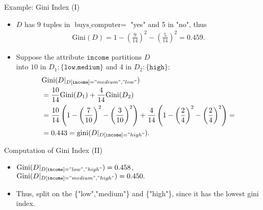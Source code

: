\begin{frame}{Example: Gini Index (I)}
	\begin{itemize}
		\item $D$ has $9$ tuples in $\text{buys\_computer} =$ "yes" and 5 in "no", thus
		      \begin{align*}
			      \text{Gini}(D) = 1 - \left( \frac{9}{14} \right)^2 - \left( \frac{5}{14} \right)^2 = 0.459.
		      \end{align*}
		\item Suppose the attribute $\texttt{income}$ partitions $D$ \\ into $10$ in
		      $D_1:\{\texttt{low,medium}\}$ and $4$ in $D_2: \{\texttt{high}\}$:
		      \begin{align*}
			       & \text{Gini}(D\vert_{D[\texttt{income}]="medium", "low"})                                                                                                                                   \\
			       & = \frac{10}{14} \text{Gini}(D_1) + \frac{4}{14} \text{Gini}(D_2)                                                                                                                           \\
			       & =\frac{10}{14} \left(1-\left( \frac{7}{10} \right)^2 - \left( \frac{3}{10} \right)^2 \right) + \frac{4}{14} \left( 1-\left( \frac{2}{4} \right)^2 - \left( \frac{2}{4} \right)^2 \right) = \\
			       & = 0.443 = \text{gini}(D\vert_{D[\texttt{income}]="high"}).
		      \end{align*}
	\end{itemize}
\end{frame}

\begin{frame}{Computation of Gini Index (II)}
	\begin{itemize}
		\item $\text{Gini}(D\vert_{D[\texttt{income}]="low", "high"}) = 0.458$,\\
		      $\text{Gini}(D\vert_{D[\texttt{income}]="medium", "high"}) = 0.450.$
		\item Thus, split on the \{"low","medium"\} and \{"high"\}, since it has the lowest gini index.
	\end{itemize}
\end{frame}

